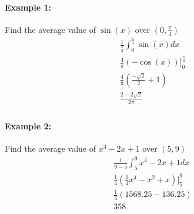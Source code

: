 \documentclass[../revisedmain.tex]{subfiles}
\begin{document}
	\paragraph{Example 1:} Find the average value of $\sin(x)$ over $(0,\frac{\pi}{4})$
	\begin{gather*}
		\frac{1}{\frac{\pi}{4}}\int_{0}^{\frac{\pi}{4}}\sin(x)dx\\
		\frac{4}{\pi}(-\cos(x))]_{0}^{\frac{\pi}{4}}\\
		\frac{4}{\pi}(\frac{-\sqrt{2}}{2}+1)\\
		\frac{2-2\sqrt{2}}{2\pi}\\
	\end{gather*}
	\paragraph{Example 2:} Find the average value of $x^3-2x+1$ over $(5,9)$
	\begin{gather*}
		\frac{1}{9-5}\int_{5}^{9}x^3-2x+1dx\\
		\frac{1}{4}(\frac{1}{4}x^4-x^2+x)]_{5}^{9}\\
		\frac{1}{4}(1568.25-136.25)\\
		358\\
	\end{gather*}
\end{document}
